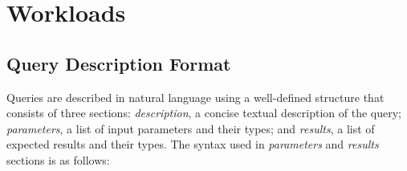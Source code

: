\chapter{Workloads}
\label{section:workloads}

\section{Query Description Format}
\label{sub:queries_structure}
Queries are described in natural language using a well-defined structure that consists of three sections:
\textit{description}, a concise textual description of the query;
\textit{parameters}, a list of input parameters and their types;
and \textit{results}, a list of expected results and their types.
The syntax used in \textit{parameters} and \textit{results} sections is as follows:

